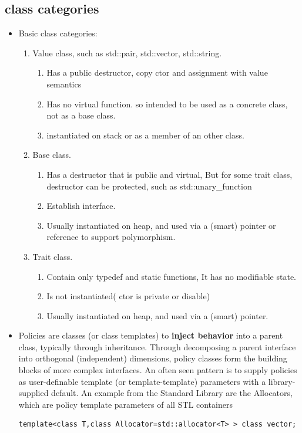 \documentclass[a4paper,11pt,twoside]{book}
\begin{document}
\subsection{class categories}
\begin{itemize}
	\item Basic class categories:
	\begin{enumerate}
		\item Value class, such as std::pair, std::vector, std::string.
		\begin{enumerate}
			\item Has a public destructor, copy ctor and assignment with value semantics
			\item Has no virtual function. so intended to be used as a concrete class, not as a base class.
			\item instantiated on stack or as a member of an other class.
		\end{enumerate}
		
		\item Base class.
		\begin{enumerate}
			\item Has a destructor that is public and virtual, But for some trait class, destructor can be protected, such as std::unary\_function
			\item Establish interface.
			\item Usually instantiated on heap, and used via a (smart) pointer or reference to support polymorphism.
		\end{enumerate}
		
		\item Trait class.
		\begin{enumerate}
			\item Contain only typedef and static functions, It has no modifiable state.
			\item Is not instantiated( ctor is private or disable)
			\item Usually instantiated on heap, and used via a (smart) pointer.
		\end{enumerate}
	\end{enumerate}
	
	\item Policies are classes (or class templates) to \textbf{inject behavior} into a parent class, typically through inheritance. Through decomposing a parent interface into orthogonal (independent) dimensions, policy classes form the building blocks of more complex interfaces. An often seen pattern is to supply policies as user-definable template (or template-template) parameters with a library-supplied default. An example from the Standard Library are the Allocators, which are policy template parameters of all STL containers
\begin{lstlisting}[numbers=none]
template<class T,class Allocator=std::allocator<T> > class vector;
\end{lstlisting}
	

\end{itemize}
\end{document}
